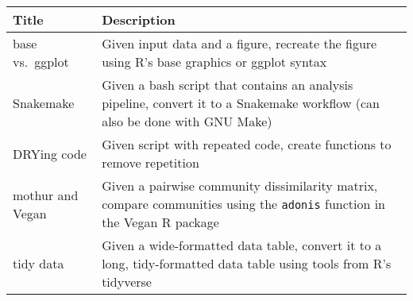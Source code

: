 \documentclass[
  11pt,
]{article}
\begin{document}
\begin{longtable}[]{@{}ll@{}}
\toprule
\begin{minipage}[b]{0.25\columnwidth}\raggedright
\textbf{Title}\strut
\end{minipage} & \begin{minipage}[b]{0.69\columnwidth}\raggedright
\textbf{Description}\strut
\end{minipage}\tabularnewline
\midrule
\endhead
\begin{minipage}[t]{0.25\columnwidth}\raggedright
base vs.~ggplot\strut
\end{minipage} & \begin{minipage}[t]{0.69\columnwidth}\raggedright
Given input data and a figure, recreate the figure using R's base
graphics or ggplot syntax\strut
\end{minipage}\tabularnewline
\begin{minipage}[t]{0.25\columnwidth}\raggedright
Snakemake\strut
\end{minipage} & \begin{minipage}[t]{0.69\columnwidth}\raggedright
Given a bash script that contains an analysis pipeline, convert it to a
Snakemake workflow (can also be done with GNU Make)\strut
\end{minipage}\tabularnewline
\begin{minipage}[t]{0.25\columnwidth}\raggedright
DRYing code\strut
\end{minipage} & \begin{minipage}[t]{0.69\columnwidth}\raggedright
Given script with repeated code, create functions to remove
repetition\strut
\end{minipage}\tabularnewline
\begin{minipage}[t]{0.25\columnwidth}\raggedright
mothur and Vegan\strut
\end{minipage} & \begin{minipage}[t]{0.69\columnwidth}\raggedright
Given a pairwise community dissimilarity matrix, compare communities
using the \texttt{adonis} function in the Vegan R package\strut
\end{minipage}\tabularnewline
\begin{minipage}[t]{0.25\columnwidth}\raggedright
tidy data\strut
\end{minipage} & \begin{minipage}[t]{0.69\columnwidth}\raggedright
Given a wide-formatted data table, convert it to a long, tidy-formatted
data table using tools from R's tidyverse\strut
\end{minipage}\tabularnewline

\end{longtable}
\end{document}
